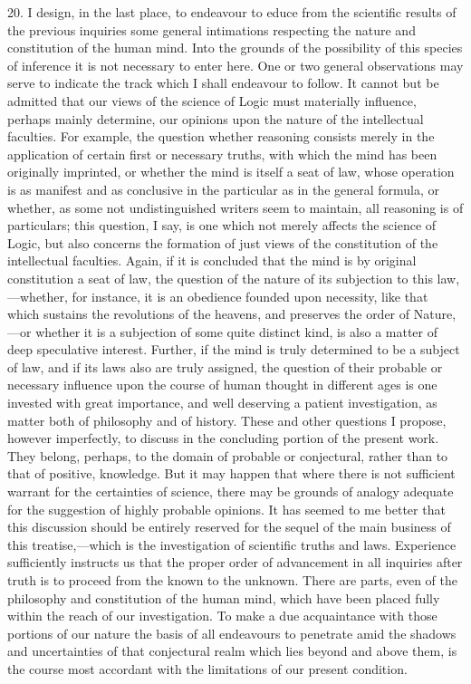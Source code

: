 \documentclass[oneside]{book}
\begin{document}
20. I design, in the last place, to endeavour to educe from
the scientific results of the previous inquiries some general intimations
respecting the nature and constitution of the human
mind. Into the grounds of the possibility of this species of inference
it is not necessary to enter here. One or two general
observations may serve to indicate the track which I shall endeavour
to follow. It cannot but be admitted that our views of
the science of Logic must materially influence, perhaps mainly
determine, our opinions upon the nature of the intellectual faculties.
For example, the question whether reasoning consists
merely in the application of certain first or necessary truths,
with which the mind has been originally imprinted, or whether
the mind is itself a seat of law, whose operation is as manifest
and as conclusive in the particular as in the general formula, or
whether, as some not undistinguished writers seem to maintain,
all reasoning is of particulars; this question, I say, is one which
not merely affects the science of Logic, but also concerns the formation
of just views of the constitution of the intellectual faculties.
Again, if it is concluded that the mind is by original
constitution a seat of law, the question of the nature of its subjection
to this law,---whether, for instance, it is an obedience
founded upon necessity, like that which sustains the revolutions
of the heavens, and preserves the order of Nature,---or whether
it is a subjection of some quite distinct kind, is also a matter of
deep speculative interest. Further, if the mind is truly determined
to be a subject of law, and if its laws also are truly assigned,
the question of their probable or necessary influence upon the
course of human thought in different ages is one invested with
great importance, and well deserving a patient investigation, as
matter both of philosophy and of history. These and other
questions I propose, however imperfectly, to discuss in the concluding
portion of the present work. They belong, perhaps, to
the domain of probable or conjectural, rather than to that of positive,
knowledge. But it may happen that where there is not
sufficient warrant for the certainties of science, there may be
grounds of analogy adequate for the suggestion of highly probable
opinions. It has seemed to me better that this discussion
should be entirely reserved for the sequel of the main business of
this treatise,---which is the investigation of scientific truths and
laws. Experience sufficiently instructs us that the proper order
of advancement in all inquiries after truth is to proceed from the
known to the unknown. There are parts, even of the philosophy
and constitution of the human mind, which have been placed
fully within the reach of our investigation. To make a due acquaintance
with those portions of our nature the basis of all endeavours
to penetrate amid the shadows and uncertainties of that
conjectural realm which lies beyond and above them, is the
course most accordant with the limitations of our present condition.
\end{document}
